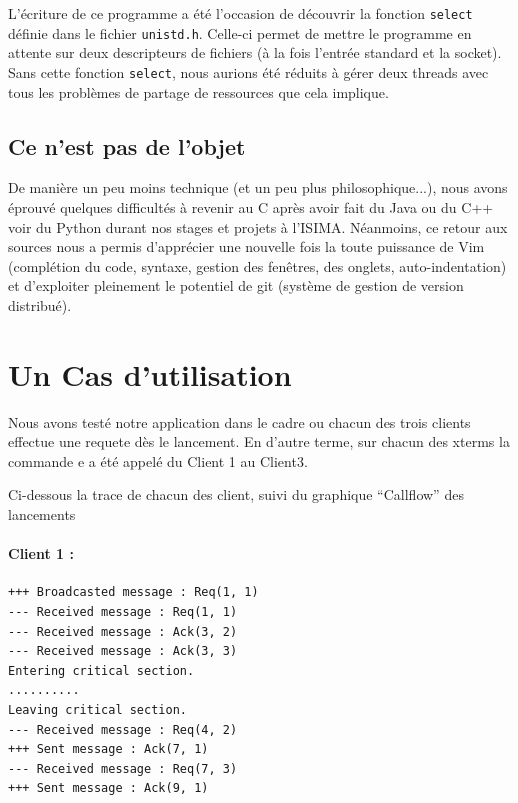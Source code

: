 L'écriture de ce programme a été l'occasion de découvrir la fonction \verb|select| définie dans le fichier \verb|unistd.h|. Celle-ci permet de mettre le programme en attente sur deux descripteurs de fichiers (à la fois l'entrée standard et la socket). Sans cette fonction \verb|select|, nous aurions été réduits à gérer deux threads avec tous les problèmes de partage de ressources que cela implique.

\subsection{Ce n'est pas de l'objet}

De manière un peu moins technique (et un peu plus philosophique...), nous avons éprouvé quelques difficultés à revenir au C après avoir fait du Java ou du C++ voir du Python durant nos stages et projets à l'ISIMA. Néanmoins, ce retour aux sources nous a permis d'apprécier une nouvelle fois la toute puissance de Vim (complétion du code, syntaxe, gestion des fenêtres, des onglets, auto-indentation) et d'exploiter pleinement le potentiel de git (système de gestion de version distribué).

\section{Un Cas d'utilisation}
Nous avons testé notre application dans le cadre ou chacun des trois clients effectue une requete dès le lancement. En d'autre terme, sur chacun des xterms la commande e a été appelé du Client 1 au Client3.

Ci-dessous la trace de chacun des client, suivi du graphique ``Callflow'' des lancements 
\paragraph{Client 1 : \\}

        \begin{minipage}{0.90\textwidth}
                \begin{lstlisting}
+++ Broadcasted message : Req(1, 1)
--- Received message : Req(1, 1)
--- Received message : Ack(3, 2)
--- Received message : Ack(3, 3)
Entering critical section.
..........
Leaving critical section.
--- Received message : Req(4, 2)
+++ Sent message : Ack(7, 1)
--- Received message : Req(7, 3)
+++ Sent message : Ack(9, 1)
                \end{lstlisting}
        \end{minipage}


